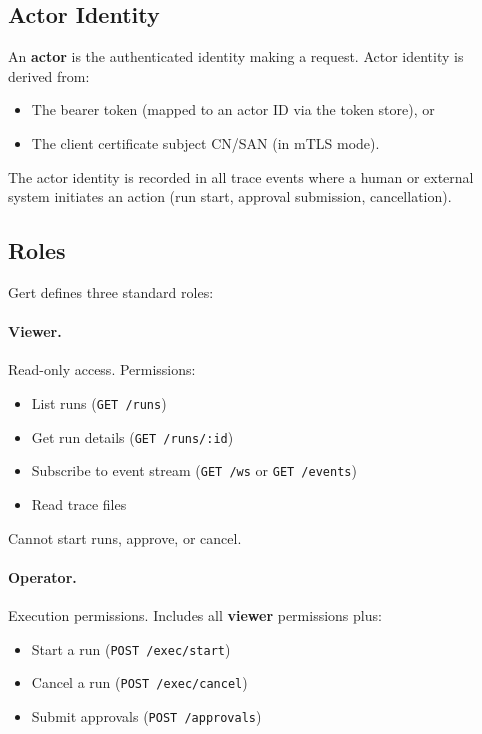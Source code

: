 \subsection{Actor Identity}

An \textbf{actor} is the authenticated identity making a request.  Actor
identity is derived from:

\begin{itemize}
  \item The bearer token (mapped to an actor ID via the token store), or
  \item The client certificate subject CN/SAN (in mTLS mode).
\end{itemize}

The actor identity is recorded in all trace events where a human or external
system initiates an action (run start, approval submission, cancellation).

\subsection{Roles}

Gert defines three standard roles:

\paragraph{Viewer.}
Read-only access.  Permissions:

\begin{itemize}
  \item List runs (\texttt{GET /runs})
  \item Get run details (\texttt{GET /runs/:id})
  \item Subscribe to event stream (\texttt{GET /ws} or \texttt{GET /events})
  \item Read trace files
\end{itemize}

Cannot start runs, approve, or cancel.

\paragraph{Operator.}
Execution permissions.  Includes all \textbf{viewer} permissions plus:

\begin{itemize}
  \item Start a run (\texttt{POST /exec/start})
  \item Cancel a run (\texttt{POST /exec/cancel})
  \item Submit approvals (\texttt{POST /approvals})
\end{itemize}

